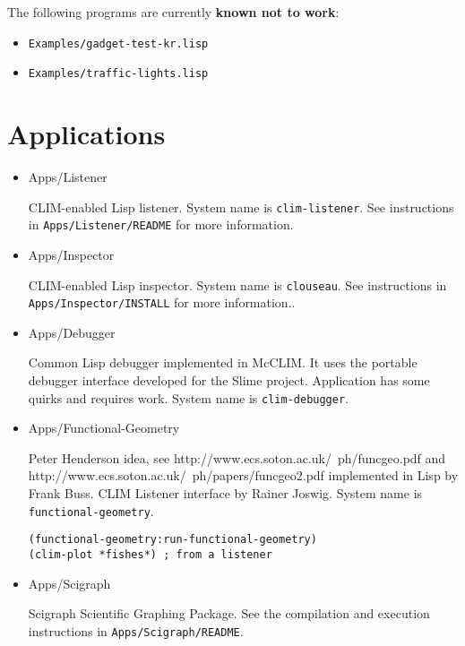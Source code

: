 The following programs are currently \textbf{known not to work}:
\begin{itemize}
\item
 \texttt{Examples/gadget-test-kr.lisp}
\item
 \texttt{Examples/traffic-lights.lisp}
\end{itemize}

\section{Applications}

\begin{itemize}
\item Apps/Listener

  CLIM-enabled Lisp listener. System name is
  \texttt{clim-listener}. See instructions in
  \texttt{Apps/Listener/README} for more information.

\item Apps/Inspector

  CLIM-enabled Lisp inspector. System name is \texttt{clouseau}. See
  instructions in \texttt{Apps/Inspector/INSTALL} for more
  information..

\item Apps/Debugger

  Common Lisp debugger implemented in McCLIM. It uses the portable
  debugger interface developed for the Slime project. Application has
  some quirks and requires work. System name is
  \texttt{clim-debugger}.

\item Apps/Functional-Geometry

  Peter Henderson idea, see http://www.ecs.soton.ac.uk/~ph/funcgeo.pdf
  and http://www.ecs.soton.ac.uk/~ph/papers/funcgeo2.pdf implemented
  in Lisp by Frank Buss. CLIM Listener interface by Rainer
  Joswig. System name is \texttt{functional-geometry}.

\begin{verbatim}
(functional-geometry:run-functional-geometry)
(clim-plot *fishes*) ; from a listener
\end{verbatim}

\item Apps/Scigraph

  Scigraph Scientific Graphing Package. See the compilation and
  execution instructions in \texttt{Apps/Scigraph/README}.
\end{itemize}

